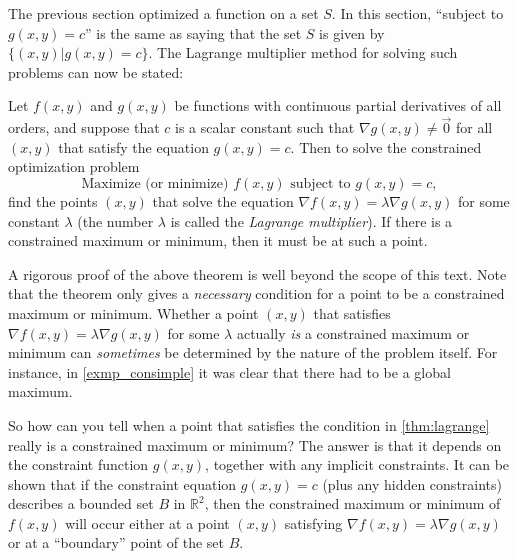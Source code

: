 The previous section optimized a function on a set $S$.  In this section, ``subject to $g(x,y)=c$'' is the same as saying that the set $S$ is given by $\{(x,y)|g(x,y)=c\}$. The Lagrange multiplier method for solving such problems can now be stated:

\begin{theorem}\label{thm:lagrange}
Let $f(x,y)$ and $g(x,y)$ be functions with continuous partial derivatives of all orders, and suppose that $c$ is a scalar constant such that $\nabla g(x,y) \ne \vec0$ for all $(x,y)$ that satisfy the equation $g(x,y) = c$. Then to solve the constrained optimization problem
\[\text{Maximize (or minimize) }f(x,y)\text{ subject to }g(x,y) = c ,\]
find the points $(x,y)$ that solve the equation $\nabla f(x,y) = \lambda \nabla g(x,y)$ for some constant $\lambda$ (the number $\lambda$ is called the \emph{Lagrange multiplier}). If there is a constrained maximum or minimum, then it must be at such a point.
\end{theorem}

A rigorous proof of the above theorem is well beyond the scope of this text.
Note that the theorem only gives a \emph{necessary} condition for a point to be a constrained maximum or minimum. Whether a point $(x,y)$ that satisfies $\nabla f(x,y) = \lambda \nabla g(x,y)$ for some $\lambda$ actually \emph{is} a constrained maximum or minimum can \emph{sometimes} be determined by the nature of the problem itself. For instance, in \autoref{exmp_consimple} it was clear that there had to be a global maximum.

So how can you tell when a point that satisfies the condition in \autoref{thm:lagrange} really is a constrained maximum or minimum? The answer is that it depends on the constraint function $g(x,y)$, together with any implicit constraints. It can be shown
that if the constraint equation $g(x,y)=c$ (plus any hidden constraints) describes a bounded set $B$ in $\mathbb{R}^2$, then the constrained maximum or minimum of $f(x,y)$ will occur either at a point $(x,y)$ satisfying $\nabla f(x,y) = \lambda \nabla g(x,y)$ or at a ``boundary'' point of the set $B$.


